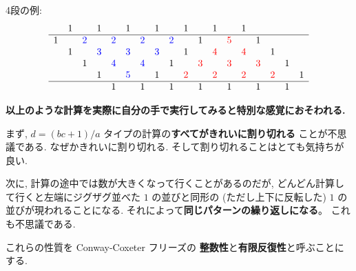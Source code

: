 \documentclass[12pt,twoside,dvipdfm]{jarticle}
\newcommand\red{\color{red}}
\newcommand\blue{\color{blue}}
\renewcommand\r{\red}
\renewcommand\b{\blue}
\theoremstyle{definition} %
\theoremstyle{definition} %
\theoremstyle{definition} %
\numberwithin{theorem}{section}
\numberwithin{equation}{section}
\numberwithin{figure}{section}
\numberwithin{table}{section}
\begin{document}
4段の例:
\begin{equation}
\begin{array}{cccccccccccccccccc}
   & 1 &   & 1 &   & 1 &   & 1 &   & 1 &   & 1 &   & 1 &   &   &   &   \\ \hline
 1 &   &\b2&   &\b2&   &\b2&   &\b2&   & 1 &   &\r5&   & 1 &   &   &   \\
   & 1 &   &\b3&   &\b3&   &\b3&   & 1 &   &\r4&   &\r4&   & 1 &   &   \\
   &   & 1 &   &\b4&   &\b4&   & 1 &   &\r3&   &\r3&   &\r3&   & 1 &   \\
   &   &   & 1 &   &\b5&   & 1 &   &\r2&   &\r2&   &\r2&   &\r2&   & 1 \\ \hline
   &   &   &   & 1 &   & 1 &   & 1 &   & 1 &   & 1 &   & 1 &   & 1 &   \\
\end{array}
\label{eq:CCFA4}
\end{equation} 

{\bf 以上のような計算を実際に自分の手で実行してみると特別な感覚におそわれる.}

まず, $d = (bc+1)/a$ タイプの計算の{\red\bf すべてがきれいに割り切れる}
ことが不思議である. なぜかきれいに割り切れる.
そして割り切れることはとても気持ちが良い.

次に, 計算の途中では数が大きくなって行くことがあるのだが,
どんどん計算して行くと左端にジグザグ並べた $1$ の並びと同形の
(ただし上下に反転した) $1$ の並びが現われることになる.
それによって{\red\bf 同じパターンの繰り返しになる}。
これも不思議である.

これらの性質を Conway-Coxeter フリーズの
{\red\bf 整数性}と{\red\bf 有限反復性}と呼ぶことにする.
\end{document}
